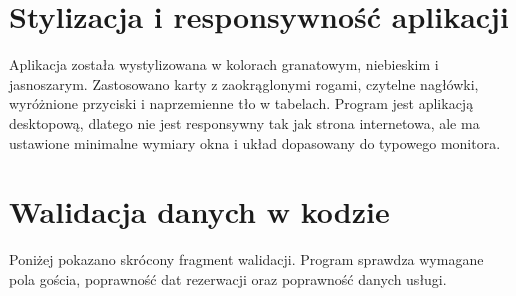 \section{Stylizacja i responsywność aplikacji}

Aplikacja została wystylizowana w kolorach granatowym, niebieskim i jasnoszarym. Zastosowano karty z zaokrąglonymi rogami, czytelne nagłówki, wyróżnione przyciski i naprzemienne tło w tabelach. Program jest aplikacją desktopową, dlatego nie jest responsywny tak jak strona internetowa, ale ma ustawione minimalne wymiary okna i układ dopasowany do typowego monitora.

\section{Walidacja danych w kodzie}

Poniżej pokazano skrócony fragment walidacji. Program sprawdza wymagane pola gościa, poprawność dat rezerwacji oraz poprawność danych usługi.


